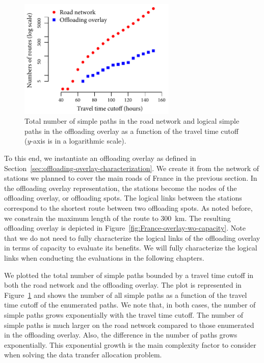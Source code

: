 \begin{figure}
    \includegraphics[width=7.5cm]{results/pathcount.pdf}
    \caption{Total number of simple paths in the road network and logical simple paths in the offloading overlay as a function of the travel time cutoff ($y$-axis is in a logarithmic scale).}
    \label{fig:pathcount}
\end{figure}
To this end, we instantiate an offloading overlay as defined in Section~\ref{sec:offloading-overlay-characterization}. We create it from the network of stations we planned to cover the main roads of France in the previous section. In the offloading overlay representation, the stations become the nodes of the offloading overlay, or offloading spots. The logical links between the stations correspond to the shortest route between two offloading spots. As noted before, we constrain the maximum length of the route to 300~km. The resulting offloading overlay is depicted in Figure~\ref{fig:France-overlay-wo-capacity}. Note that we do not need to fully characterize the logical links of the offloading overlay in terms of capacity to evaluate its benefits. We will fully characterize the logical links when conducting the evaluations in the following chapters.

We plotted the total number of simple paths bounded by a travel time cutoff in both the road network and the offloading overlay. The plot is represented in Figure~\ref{fig:pathcount} and shows the number of all simple paths as a function of the travel time cutoff of the enumerated paths. We note that, in both cases, the number of simple paths grows exponentially with the travel time cutoff. The number of simple paths is much larger on the road network compared to those enumerated in the offloading overlay. Also, the difference in the number of paths grows exponentially. This exponential growth is the main complexity factor to consider when solving the data transfer allocation problem.

